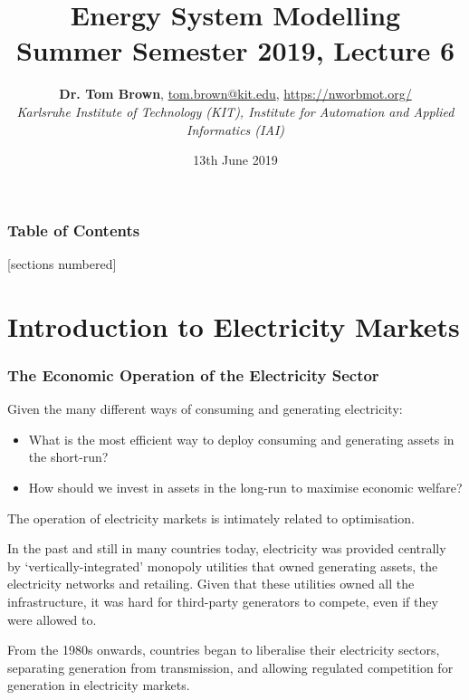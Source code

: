 \documentclass[10pt,dvipsnames]{beamer}
\title{Energy System Modelling\\ Summer Semester 2019, Lecture 6}
\author{
  {\bf Dr. Tom Brown}, \href{mailto:tom.brown@kit.edu}{tom.brown@kit.edu}, \url{https://nworbmot.org/}\\
  \emph{Karlsruhe Institute of Technology (KIT), Institute for Automation and Applied Informatics (IAI)}
}
\date{\vspace{.3cm}13th June 2019}
\let\olditem\item
\renewcommand{\item}{%
\olditem\vspace{5pt}}
\begin{document}
\maketitle


\begin{frame}

  \frametitle{Table of Contents}
  [sections numbered]
  \tableofcontents[hideallsubsections]
\end{frame}


\section{Introduction to Electricity Markets}


\begin{frame}
  \frametitle{The Economic Operation of the Electricity Sector}


  Given the many different ways of consuming and generating
  electricity:

  \begin{itemize}
    \item   What is the \alert{most efficient} way to deploy consuming and generating
  assets in the short-run?
    \item How should we invest in assets in the long-run to \alert{maximise economic welfare}?
  \end{itemize}

  The operation of electricity markets is intimately related to
  \alert{optimisation}.

  In the past and still in many countries today, electricity was
  provided centrally by `vertically-integrated' monopoly utilities
  that owned generating assets, the electricity networks and
  retailing.  Given that these utilities owned all the infrastructure,
  it was hard for third-party generators to compete, even if they were
  allowed to.

  From the 1980s onwards, countries began to liberalise their
  electricity sectors, separating generation from transmission, and
  allowing regulated competition for generation in \alert{electricity markets}.
\end{frame}
\end{document}
